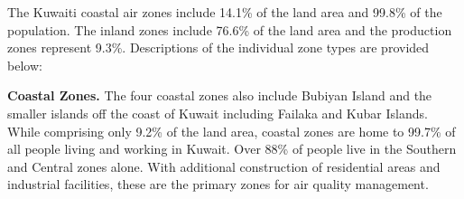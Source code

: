 \begin{table}[!htb]
\centering
\caption{Air Quality Zone Statistics.}
\label{tb:aqzstats}
\end{table}

The Kuwaiti coastal air zones include 14.1\% of the land area and 99.8\% of the population.  The inland zones include 76.6\% of the land area and the production zones represent 9.3\%.  Descriptions of the individual zone types are provided below:

\textbf{Coastal Zones.} The four coastal zones also include Bubiyan Island and the smaller islands off the coast of Kuwait including Failaka and Kubar Islands.  While comprising only 9.2\% of the land area, coastal zones are home to 99.7\% of all people living and working in Kuwait. Over 88\% of people live in the Southern and Central zones alone.  With additional construction of residential areas and industrial facilities, these are the primary zones for air quality management. 

